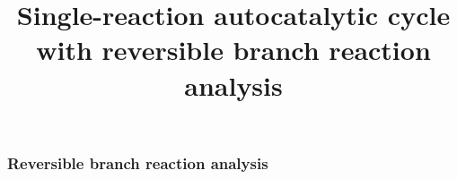 \documentclass[a4page,notitlepage]{article}
\begin{document}

\title{Single-reaction autocatalytic cycle with reversible branch reaction analysis}
\subsubsection{Reversible branch reaction analysis}

\end{document}
